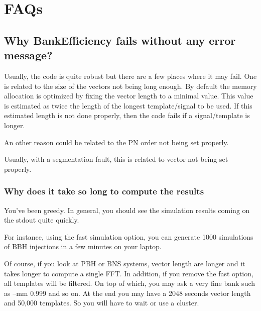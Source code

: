 \documentclass[a4paper,10pt]{article}
\begin{document}
\section{FAQs}\label{faqs}
\subsection{Why BankEfficiency fails without any error message? }
Usually, the code is quite robust but there are a few places where it may fail. One is related to the size of the vectors not being long enough. By default the memory allocation is optimized by fixing the vector length to a minimal value. This value is estimated as twice the length of the longest template/signal to be used. If this estimated length is not done properly, then the code fails if a signal/template is longer.

An other reason could be related to the PN order not being set properly.

Usually, with a segmentation fault, this is related to vector not being set properly.

\subsubsection{Why does it take so long to compute the results}
You've been greedy. In general, you should see the simulation results coming on the stdout quite quickly. 

For instance, using the fast simulation option, you can generate 1000 simulations of BBH injections in a few minutes on your laptop. 

Of course, if you look at PBH or BNS systems, vector length are longer and it takes longer to compute a single FFT. In addition, if you remove the fast option, all templates will be filtered. On top of which, you may ask a very fine bank such as --mm 0.999 and so on. At the end you may have a 2048 seconds vector length and 50,000 templates. So you will have to wait or use a cluster. 
\end{document}
